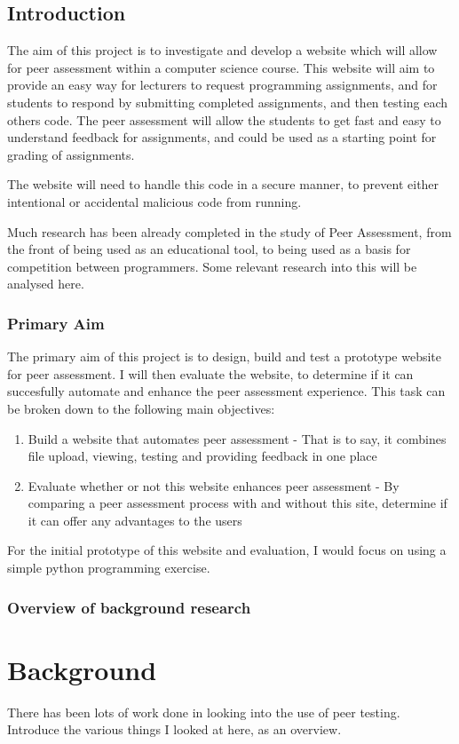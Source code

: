 \documentclass[a4paper,11pt]{report}
\begin{document}
\section{Introduction}
The aim of this project is to investigate and develop a website which will allow for peer assessment within a computer science course. This website will aim to provide an easy way for lecturers to request programming assignments, and for students to respond by submitting completed assignments, and then testing each others code. The peer assessment will allow the students to get fast and easy to understand feedback for assignments, and could be used as a starting point for grading of assignments.\par
The website will need to handle this code in a secure manner, to prevent either intentional or accidental malicious code from running.\par
Much research has been already completed in the study of Peer Assessment, from the front of being used as an educational tool, to being used as a basis for competition between programmers. Some relevant research into this will be analysed here.

\subsection{Primary Aim}
The primary aim of this project is to design, build and test a prototype website for peer assessment. I will then evaluate the website, to determine if it can succesfully automate and enhance the peer assessment experience. This task can be broken down to the following main objectives:
\begin{enumerate}
\item Build a website that automates peer assessment - That is to say, it combines file upload, viewing, testing and providing feedback in one place
\item Evaluate whether or not this website enhances peer assessment - By comparing a peer assessment process with and without this site, determine if it can offer any advantages to the users
\end{enumerate}
For the initial prototype of this website and evaluation, I would focus on using a simple python programming exercise.
\subsection{Overview of background research}

\chapter{Background}
There has been lots of work done in looking into the use of peer testing. Introduce the various things I looked at here, as an overview.
\end{document}

